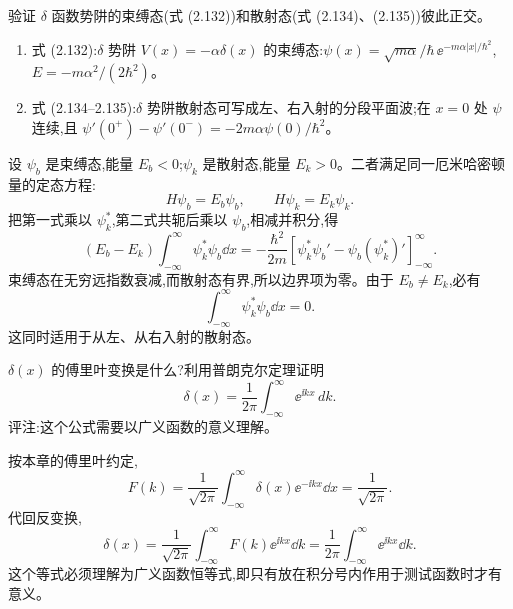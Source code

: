 \begin{question}
验证 $\delta$ 函数势阱的束缚态(式 (2.132))和散射态(式 (2.134)、(2.135))彼此正交。

\par\smallskip
{}
\begin{enumerate}[leftmargin=2.2em,itemsep=0.12em,topsep=0.12em,parsep=0pt]
\item 式 (2.132):$\delta$ 势阱 $V(x)=-\alpha\delta(x)$ 的束缚态:$\psi(x)=\sqrt{m\alpha}/\hbar\,\ee^{-m\alpha|x|/\hbar^2}$,$E=-m\alpha^2/(2\hbar^2)$。
\item 式 (2.134--2.135):$\delta$ 势阱散射态可写成左、右入射的分段平面波;在 $x=0$ 处 $\psi$ 连续,且 $\psi'(0^+)-\psi'(0^-)=-2m\alpha\psi(0)/\hbar^2$。
\end{enumerate}

\begin{solution}
设 $\psi_b$ 是束缚态,能量 $E_b<0$;$\psi_k$ 是散射态,能量 $E_k>0$。二者满足同一厄米哈密顿量的定态方程:
\[
H\psi_b=E_b\psi_b,
\qquad
H\psi_k=E_k\psi_k.
\]
把第一式乘以 $\psi_k^*$,第二式共轭后乘以 $\psi_b$,相减并积分,得
\[
(E_b-E_k)\int_{-\infty}^{\infty}\psi_k^*\psi_b\dd x
=-\frac{\hbar^2}{2m}\left[\psi_k^*\psi_b'-\psi_b(\psi_k^*)'\right]_{-\infty}^{\infty}.
\]
束缚态在无穷远指数衰减,而散射态有界,所以边界项为零。由于 $E_b\ne E_k$,必有
\[
\int_{-\infty}^{\infty}\psi_k^*\psi_b\dd x=0.
\]
这同时适用于从左、从右入射的散射态。
\end{solution}
\end{question}

\begin{question}
$\delta(x)$ 的傅里叶变换是什么?利用普朗克尔定理证明
\[
\delta(x)=\frac{1}{2\pi}\int_{-\infty}^{\infty}\ee^{\ii kx}\,dk .
\]
评注:这个公式需要以广义函数的意义理解。
\begin{solution}
按本章的傅里叶约定,
\[
F(k)=\frac1{\sqrt{2\pi}}\int_{-\infty}^{\infty}\delta(x)\ee^{-\ii kx}\dd x
=\frac1{\sqrt{2\pi}}.
\]
代回反变换,
\[
\delta(x)=\frac1{\sqrt{2\pi}}\int_{-\infty}^{\infty}F(k)\ee^{\ii kx}\dd k
=\frac1{2\pi}\int_{-\infty}^{\infty}\ee^{\ii kx}\dd k.
\]
这个等式必须理解为广义函数恒等式,即只有放在积分号内作用于测试函数时才有意义。
\end{solution}
\end{question}

